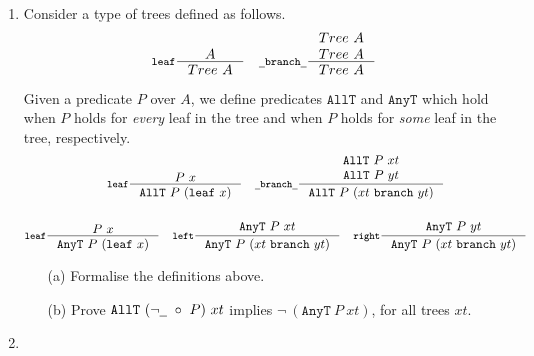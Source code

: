 \documentclass{examhons2018}
\begin{document}
\begin{enumerate}

\item \rubricqA

\newcommand{\Tree}{\texttt{Tree}}
\newcommand{\AllT}{\texttt{AllT}}
\newcommand{\AnyT}{\texttt{AnyT}}
\newcommand{\leaf}{\texttt{leaf}}
\newcommand{\branch}{\texttt{branch}}
\newcommand{\here}{\texttt{here}}
\renewcommand{\left}{\texttt{left}}
\renewcommand{\right}{\texttt{right}}
\newcommand{\ubar}{\texttt{\underline{~}}}

Consider a type of trees defined as follows.
\begin{gather*}
%
  \inference[\leaf]
    {A}
    {Tree~A}
%
\quad
%
  \inference[\ubar\branch\ubar]
    {Tree~A \\
     Tree~A}
   {Tree~A}
%
\end{gather*}

Given a predicate $P$ over $A$, we define predicates $\AllT$ and
$\AnyT$ which hold when $P$ holds for \emph{every} leaf in the tree
and when $P$ holds for \emph{some} leaf in the tree, respectively.
\begin{gather*}
%
  \inference[\leaf]
    {P~x}
    {\AllT~P~(\leaf~x)}
%
\quad
%
  \inference[\ubar\branch\ubar]
    {\AllT~P~xt \\
     \AllT~P~yt}
    {\AllT~P~(xt~\branch~yt)}
%
\\~\\
%
  \inference[\leaf]
    {P~x}
    {\AnyT~P~(\leaf~x)}
%
\quad
%
  \inference[\left]
    {\AnyT~P~xt}
    {\AnyT~P~(xt~\branch~yt)}
%
\quad
%
  \inference[\right]
    {\AnyT~P~yt}
    {\AnyT~P~(xt~\branch~yt)}
%
\end{gather*}

\begin{itemize}

\item[(a)] Formalise the definitions above.


\item[(b)] Prove $\AllT~({\neg\ubar}~\circ~P)~xt$
  implies $\neg~(\AnyT~P~xt)$, for all trees $xt$.


\end{itemize}

\newpage

\item \rubricqB

\newcommand{\COMP}{\texttt{Comp}}
\newcommand{\OK}{\texttt{ok}}
\newcommand{\ERROR}{\texttt{error}}
\newcommand{\LETC}{\texttt{letc}}
\newcommand{\IN}{\texttt{in}}


\end{enumerate}
\end{document}
